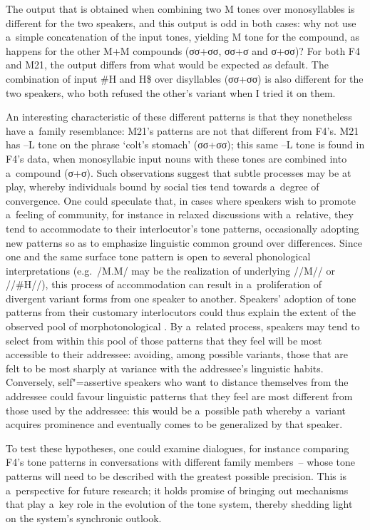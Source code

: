 The output that is obtained when combining two M tones over monosyllables is different for the two speakers, and this output is odd in both cases: why not use a~simple concatenation of
the input tones, yielding M tone for the compound, as happens for the other M+M compounds (σσ+σσ,
σσ+σ and σ+σσ)? For both F4 and M21, the output differs from what would be expected
as default. The combination of input \#H and H\$ over disyllables (σσ+σσ) is also different for the two speakers, who
both refused the other’s variant when I tried it on them. 

An interesting characteristic of these different patterns is that they nonetheless have a~family resemblance: M21’s patterns are not that
different from F4’s. M21 has --L tone on the phrase ‘colt’s stomach’ (σσ+σσ); this same --L tone is found in F4’s data, when {monosyllabic} input nouns with these tones are combined into a~compound (σ+σ). Such observations suggest that subtle processes may be at play, whereby individuals bound by social ties tend towards a~degree of convergence. One could speculate that, in cases where speakers wish to promote a~feeling of community, for instance in relaxed discussions with a~relative, they tend to accommodate to their interlocutor's tone patterns, occasionally adopting new patterns so as to emphasize linguistic common ground over differences. Since one and the same surface tone pattern is open to several phonological interpretations (e.g.~/M.M/ may be the realization of underlying \mbox{//M//} or \mbox{//\#H//}), this process of accommodation can result in a~proliferation of divergent variant forms from one speaker to another. Speakers' adoption of tone patterns from their customary interlocutors could thus explain the extent of the observed pool of morphotonological . By a~related process, speakers may tend to select from within this pool of  those patterns that they feel will be most accessible to their addressee: avoiding, among possible variants, those that are felt to be most sharply at variance with the addressee's linguistic habits. Conversely, self"=assertive speakers who want to distance themselves from the addressee could favour linguistic patterns that they feel are most different from those used by the addressee: this would be a~possible path whereby a~variant acquires prominence and eventually comes to be generalized by that speaker. 

To test these hypotheses, one could examine dialogues, for instance comparing F4's tone patterns in conversations with different family members~-- whose tone patterns will need to be described with the greatest possible precision. This is a~perspective for future research; it holds promise of bringing out mechanisms that play a~key role in the evolution of the tone system, thereby shedding light on the system's synchronic outlook. 

